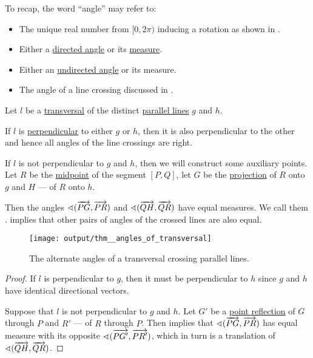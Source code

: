\begin{remark}\label{rem:angle}
  To recap, the word \enquote{angle} may refer to:
  \begin{itemize}
    \item The unique real number from \( [0, 2\pi) \) inducing a rotation as shown in .
    \item Either a \hyperref[def:angle]{directed angle} or its \hyperref[def:angle/measure]{measure}.
    \item Either an \hyperref[def:angle]{undirected angle} or its measure.
    \item The angle of a line crossing discussed in .
  \end{itemize}
\end{remark}

\begin{proposition}\label{thm:angles_of_transversal}
  Let \( l \) be a \hyperref[def:transversal_line]{transversal} of the distinct \hyperref[def:affine_parallelism]{parallel lines} \( g \) and \( h \).

  If \( l \) is \hyperref[def:perpendicularity]{perpendicular} to either \( g \) or \( h \), then it is also perpendicular to the other and hence all angles of the line crossings are right.

  If \( l \) is not perpendicular to \( g \) and \( h \), then we will construct some auxiliary points. Let \( R \) be the \hyperref[thm:segment_midpoint]{midpoint} of the segment \( [P, Q] \), let \( G \) be the \hyperref[def:orthogonal_projection]{projection} of \( R \) onto \( g \) and \( H \) --- of \( R \) onto \( h \).

  Then the angles \( \sphericalangle(\overrightarrow{PG}, \overrightarrow{PR}) \) and \( \sphericalangle(\overrightarrow{QH}, \overrightarrow{QR}) \) have equal measures. We call them .  implies that other pairs of angles of the crossed lines are also equal.

  \begin{figure}[!ht]
    \centering
    \texttt{[image: output/thm\_\_angles\_of\_transversal]}
    \caption{The alternate angles of a transversal crossing parallel lines.}\label{fig:thm:angles_of_transversal}
  \end{figure}
\end{proposition}
\begin{proof}
  If \( l \) is perpendicular to \( g \), then it must be perpendicular to \( h \) since \( g \) and \( h \) have identical directional vectors.

  Suppose that \( l \) is not perpendicular to \( g \) and \( h \). Let \( G' \) be a \hyperref[def:rigid_motion/point_reflection]{point reflection} of \( G \) through \( P \) and \( R' \) --- of \( R \) through \( P \). Then  implies that \( \sphericalangle(\overrightarrow{PG}, \overrightarrow{PR}) \) has equal measure with its opposite \( \sphericalangle(\overrightarrow{PG'}, \overrightarrow{PR'}) \), which in turn is a translation of \( \sphericalangle(\overrightarrow{QH}, \overrightarrow{QR}) \).
\end{proof}
